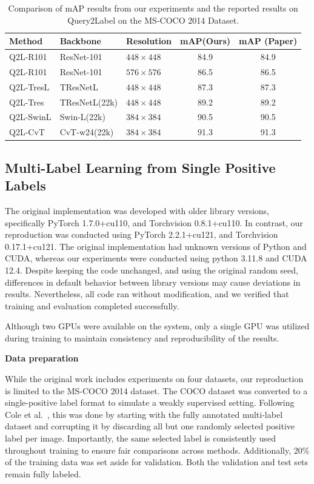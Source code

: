 \documentclass[lettersize,journal]{IEEEtran}
\renewcommand{\paragraph}[1]{%
  \vspace{1.5ex}\textbf{#1}\quad
}
\begin{document}
\begin{table}[t]
    \small
    \caption{Comparison of mAP results from our experiments and the reported results on Query2Label on the MS-COCO 2014 Dataset.}
    \label{tab:q2l_map_comparison}
    \centering
    \begin{tabular}{l l l c c}
    \toprule
    \textbf{Method} & \textbf{Backbone} & \textbf{Resolution} & \textbf{mAP(Ours)} & \textbf{mAP (Paper)} \\
    \midrule
    Q2L-R101     & ResNet-101     & $448\times448$ & 84.9 & 84.9 \\
    Q2L-R101     & ResNet-101     & $576\times576$ & 86.5 & 86.5 \\
    Q2L-TresL    & TResNetL       & $448\times448$ & 87.3 & 87.3 \\
    Q2L-Tres     & TResNetL(22k)  & $448\times448$ & 89.2 & 89.2 \\
    Q2L-SwinL    & Swin-L(22k)    & $384\times384$ & 90.5 & 90.5 \\
    Q2L-CvT      & CvT-w24(22k)   & $384\times384$ & 91.3 & 91.3 \\
    \bottomrule
    \end{tabular}
\end{table}

\subsection{Multi-Label Learning from Single Positive Labels}
The original implementation was developed with older library versions, specifically PyTorch 1.7.0+cu110, and Torchvision 0.8.1+cu110. In contrast, our reproduction was conducted using PyTorch 2.2.1+cu121, and Torchvision 0.17.1+cu121. The original implementation had unknown versions of Python and CUDA, whereas our experiments were conducted using python 3.11.8 and CUDA 12.4. Despite keeping the code unchanged, and using the original random seed, differences in default behavior between library versions may cause deviations in results. Nevertheless, all code ran without modification, and we verified that training and evaluation completed successfully.

Although two GPUs were available on the system, only a single GPU was utilized during training to maintain consistency and reproducibility of the results.

\paragraph{Data preparation}
While the original work includes experiments on four datasets, our reproduction is limited to the MS-COCO 2014 dataset. The COCO dataset was converted to a single-positive label format to simulate a weakly supervised setting. Following Cole et al.~\cite{mlsp}, this was done by starting with the fully annotated multi-label dataset and corrupting it by discarding all but one randomly selected positive label per image. Importantly, the same selected label is consistently used throughout training to ensure fair comparisons across methods. Additionally, 20\% of the training data was set aside for validation. Both the validation and test sets remain fully labeled.
\end{document}

